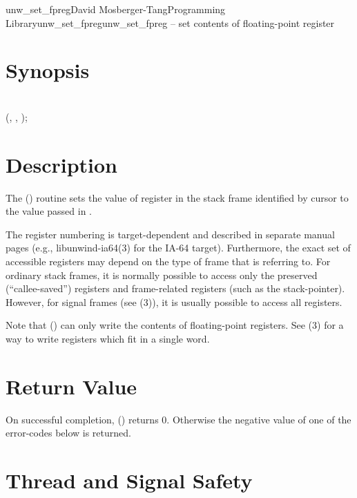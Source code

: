\documentclass{article}
\begin{document}
\begin{Name}{3}{unw\_set\_fpreg}{David Mosberger-Tang}{Programming Library}{unw\_set\_fpreg}unw\_set\_fpreg -- set contents of floating-point register
\end{Name}

\section{Synopsis}

\\

 (,  ,  );\\

\section{Description}

The () routine sets the value of register
 in the stack frame identified by cursor  to the
value passed in .

The register numbering is target-dependent and described in separate
manual pages (e.g., libunwind-ia64(3) for the IA-64 target).
Furthermore, the exact set of accessible registers may depend on the
type of frame that  is referring to.  For ordinary stack
frames, it is normally possible to access only the preserved
(``callee-saved'') registers and frame-related registers (such as the
stack-pointer).  However, for signal frames (see
(3)), it is usually possible to access
all registers.

Note that () can only write the contents of
floating-point registers.  See (3) for a way to
write registers which fit in a single word.

\section{Return Value}

On successful completion, () returns 0.
Otherwise the negative value of one of the error-codes below is
returned.

\section{Thread and Signal Safety}
\end{document}
